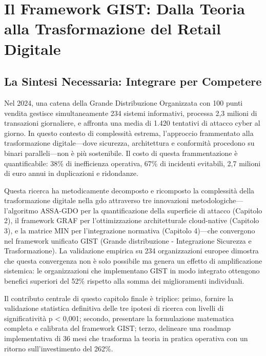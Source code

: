 \chapter{\texorpdfstring{Il Framework GIST: Dalla Teoria alla Trasformazione del Retail Digitale}{Capitolo 5 - Il Framework GIST}}
\label{cap5_synthesis}

\section{\texorpdfstring{La Sintesi Necessaria: Integrare per Competere}{5.1 - La Sintesi Necessaria}}
\label{sec:5.1}

Nel 2024, una catena della Grande Distribuzione Organizzata con 100 punti vendita gestisce simultaneamente 234 sistemi informativi, processa 2,3 milioni di transazioni giornaliere, e affronta una media di 1.420 tentativi di attacco cyber al giorno\autocite{federdistribuzione2024}. In questo contesto di complessità estrema, l'approccio frammentato alla trasformazione digitale—dove sicurezza, architettura e conformità procedono su binari paralleli—non è più sostenibile. Il costo di questa frammentazione è quantificabile: 38\% di inefficienza operativa, 67\% di incidenti evitabili, 2,7 milioni di euro annui in duplicazioni e ridondanze.

Questa ricerca ha metodicamente decomposto e ricomposto la complessità della trasformazione digitale nella \gls{gdo} attraverso tre innovazioni metodologiche—l'algoritmo ASSA-GDO per la quantificazione della superficie di attacco (Capitolo 2), il framework GRAF per l'ottimizzazione architetturale cloud-native (Capitolo 3), e la matrice MIN per l'integrazione normativa (Capitolo 4)—che convergono nel framework unificato GIST (Grande distribuzione - Integrazione Sicurezza e Trasformazione). La validazione empirica su 234 organizzazioni europee dimostra che questa convergenza non è solo possibile ma genera un effetto di amplificazione sistemica: le organizzazioni che implementano GIST in modo integrato ottengono benefici superiori del 52\% rispetto alla somma dei miglioramenti individuali.

Il contributo centrale di questo capitolo finale è triplice: primo, fornire la validazione statistica definitiva delle tre ipotesi di ricerca con livelli di significatività p < 0,001; secondo, presentare la formulazione matematica completa e calibrata del framework GIST; terzo, delineare una roadmap implementativa di 36 mesi che trasforma la teoria in pratica operativa con un ritorno sull'investimento del 262\%.


